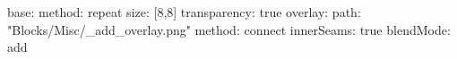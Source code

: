 base:
  method: repeat
  size: [8,8]
  transparency: true
overlay:
  path: "Blocks/Misc/_add_overlay.png"
  method: connect
  innerSeams: true
  blendMode: add